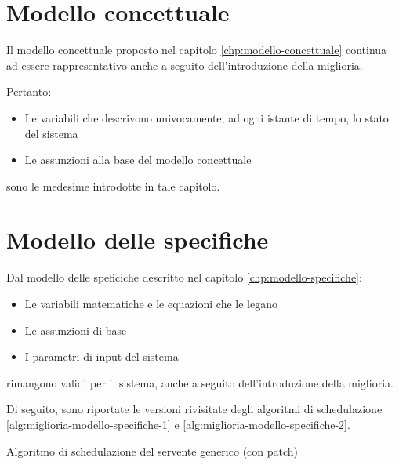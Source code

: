 \section{Modello concettuale}
Il modello concettuale proposto nel capitolo \ref{chp:modello-concettuale} continua ad essere rappresentativo anche a seguito dell'introduzione della miglioria. 

Pertanto:
\begin{itemize}
\item Le variabili che descrivono univocamente, ad ogni istante di tempo, lo stato del sistema
\item Le assunzioni alla base del modello concettuale
\end{itemize}
sono le medesime introdotte in tale capitolo.
\section{Modello delle specifiche}
Dal modello delle speficiche descritto nel capitolo \ref{chp:modello-specifiche}:
\begin{itemize}
\item Le variabili matematiche e le equazioni che le legano
\item Le assunzioni di base
\item I parametri di input del sistema
\end{itemize}
rimangono validi per il sistema, anche a seguito dell'introduzione della miglioria.

Di seguito, sono riportate le versioni rivisitate degli algoritmi di schedulazione \ref{alg:miglioria-modello-specifiche-1} e \ref{alg:miglioria-modello-specifiche-2}.

\begin{algorithm}[ht]
\SetAlgoLined
{}
\caption{Algoritmo di schedulazione del servente generico (con {\color{blue}patch})}
\label{alg:miglioria-modello-specifiche-1}
\end{algorithm}

